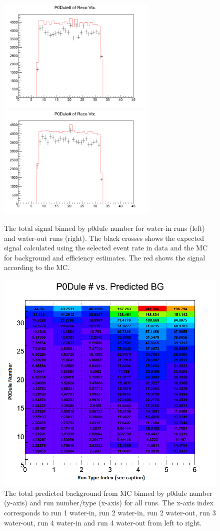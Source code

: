 \begin{figure}[h]
\centering
\includegraphics[width=3in]{Figures/TN100Plots/cNBEw.png}
\includegraphics[width=3in]{Figures/TN100Plots/cNBEa.png}
\caption{The total signal binned by p0dule number for water-in runs (left) and water-out runs (right). The black crosses shows the expected signal calculated using the selected event rate in data and the MC for background and efficiency estimates. The red shows the signal according to the MC.}
\label{fig:xstot}
\end{figure}

\begin{figure}[h]
\centering
\includegraphics[width=6in]{Figures/TN100Plots/cBG_RvZ.png}
\caption{The total predicted background from MC binned by p0dule number (y-axis) and run number/type (x-axis) for all runs. The x-axis index corresponds to run 1 water-in, run 2 water-in, run 2 water-out, run 3 water-out, run 4 water-in and run 4 water-out from left to right.}
\label{fig:xsBGvZ}
\end{figure}


